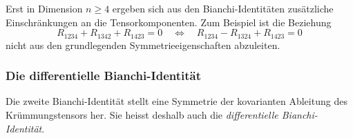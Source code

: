 Erst in Dimension $n\ge 4$ ergeben sich aus den Bianchi-Identitäten
zusätzliche Einschränkungen an die Tensorkomponenten.
Zum Beispiel ist die Beziehung
\[
R_{1234}
+
R_{1342}
+
R_{1423}
=
0
\quad\Leftrightarrow\quad
R_{1234}
-
R_{1324}
+
R_{1423}
=
0
\]
nicht aus den grundlegenden Symmetrieeigenschaften abzuleiten.

%
%
\subsubsection{Die differentielle Bianchi-Identität}
Die zweite Bianchi-Identität stellt eine Symmetrie der kovarianten Ableitung
des Krümmungstensors her.
%
%
Sie heisst deshalb auch die \emph{differentielle Bianchi-Identität}.
%
%

